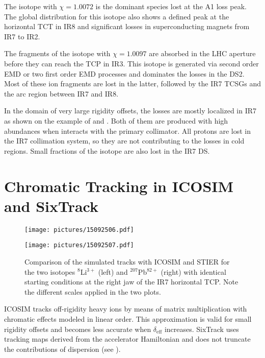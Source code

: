 The isotope  with $\chi = 1.0072$ is the dominant species lost at the A1 loss peak. The global distribution for this isotope also shows a defined peak at the horizontal TCT in IR8 and significant losses in superconducting magnets from IR7 to IR2. 

The fragments of the isotope  with $\chi=1.0097$ are absorbed in the LHC aperture before they can reach the TCP in IR3. This isotope is generated via second order EMD or two first order EMD processes and dominates the losses in the DS2. Most of these ion fragments are lost in the latter, followed by the IR7 TCSGs and the arc region between IR7 and IR8.  

In the domain of very large rigidity offsets, the losses are mostly localized in IR7 as shown on the example of  and . Both of them are produced with high abundances when \lead interacts with the primary collimator. All protons are lost in the IR7 collimation system, so they are not contributing to the losses in cold regions. Small fractions of the isotope  are also lost in the IR7 DS. 





\section{Chromatic Tracking in ICOSIM and SixTrack} \label{chap:crotr}

\begin{figure*}[b]
\begin{minipage}[t]{0.49\textwidth}
\texttt{[image: pictures/15092506.pdf]}
\end{minipage}
\begin{minipage}[t]{0.49\textwidth}
\texttt{[image: pictures/15092507.pdf]}
\end{minipage}
\caption{Comparison of the simulated tracks with ICOSIM and STIER for the two isotopes $^{8}$Li$^{3+}$ (left) and $^{207}$Pb$^{82+}$ (right) with identical starting conditions at the right jaw of the IR7 horizontal TCP. Note the different scales applied in the two plots.}
\label{fig:15032202.pdf}
\end{figure*}

ICOSIM tracks off-rigidity heavy ions by means of matrix multiplication with chromatic effects modeled in linear order. This approximation is valid for small rigidity offsets and becomes less accurate when  $\delta_\text{eff}$ increases. SixTrack uses tracking maps derived from the accelerator Hamiltonian and does not truncate the contributions of dispersion (see ).

